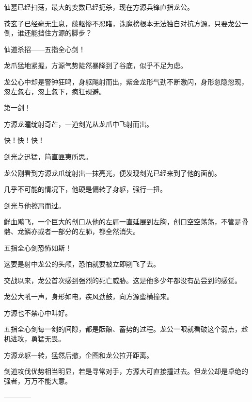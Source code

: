 \begin{this_body}
仙墓已经扫荡，最大的变数已经扼杀，现在方源兵锋直指龙公。

苍玄子已经毫无生息，藤躯惨不忍睹，诛魔榜根本无法独自对抗方源，只要龙公一倒，谁还能挡住方源的脚步？

仙道杀招——五指全心剑！

龙爪猛地紧握，方源气势陡然暴降到了谷底，似乎不足为虑。

龙公心中却是警钟狂鸣，身躯飚射而出，紫金龙形气劲不断激闪，身形忽隐忽现，忽左忽右，忽上忽下，疯狂规避。

第一剑！

方源龙瞳绽射奇芒，一道剑光从龙爪中飞射而出。

快！快！快！

剑光之迅猛，简直匪夷所思。

龙公刚看到方源龙爪绽射出一抹亮光，便发现剑光已经来到了他的面前。

几乎不可能的情况下，他硬是偏转了身躯，强行一扭。

剑光与他擦肩而过。

鲜血飚飞，一个巨大的创口从他的左肩一直延展到左胸，创口空空荡荡，不管是骨骼、龙鳞亦或者一部分的左肺，都全然消失。

五指全心剑恐怖如斯！

这要是射中龙公的头颅，恐怕就要被立即削飞了去。

交战以来，龙公首次感到强烈的死亡威胁。这是他多少年都没有品尝到的感觉。

龙公大吼一声，身形如电，疾风劲鼓，向方源蛮横撞来。

方源也不禁心中叫好。

五指全心剑每一剑的间隙，都是酝酿、蓄势的过程。龙公一眼就看破这个弱点，趁机进攻，勇猛无畏。

方源龙躯一转，猛然后撤，企图和龙公拉开距离。

剑道攻伐优势相当明显，若是寻常对手，方源大可直接撞过去。但龙公却是卓绝的强者，万万不能大意。

------------

\end{this_body}

